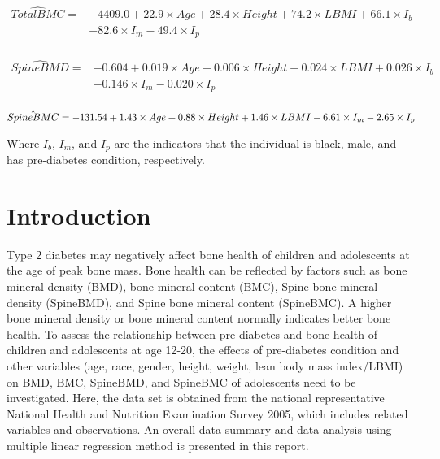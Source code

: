 \documentclass[11pt]{article}
\begin{document}
\begin{equation}
\begin{split}
\hat{TotalBMC} = &-4409.0 +22.9\times Age +28.4\times Height +74.2\times LBMI + 66.1\times I_b \\
& -82.6\times I_m -49.4\times I_p \\
\end{split}
\end{equation}

\begin{equation}
\begin{split}
\hat{SpineBMD} = &-0.604 +0.019\times Age +0.006\times Height +0.024\times LBMI + 0.026\times I_b \\
& -0.146\times I_m -0.020\times I_p \\
\end{split}
\end{equation}

\begin{equation}
\hat{SpineBMC} = -131.54 +1.43\times Age +0.88\times Height +1.46\times LBMI -6.61\times I_m -2.65\times I_p \\
\end{equation}

Where $I_b$, $I_m$, and $I_p$ are the indicators that the individual is black, male, and has pre-diabetes condition, respectively.


\newpage
\section{Introduction}
\setcounter{page}{1}
Type 2 diabetes may negatively affect bone health of children and adolescents at the age of peak bone mass. Bone health can be reflected by factors such as bone mineral density (BMD), bone mineral content (BMC), Spine bone mineral density (SpineBMD), and Spine bone mineral content (SpineBMC). A higher bone mineral density or bone mineral content normally indicates better bone health. To assess the relationship between pre-diabetes and bone health of children and adolescents at age 12-20, the effects of pre-diabetes condition and other variables (age, race, gender, height, weight, lean body mass index/LBMI) on BMD, BMC, SpineBMD, and SpineBMC of adolescents need to be investigated. Here, the data set is obtained from the national representative National Health and Nutrition Examination Survey 2005, which includes related variables and observations. An overall data summary and data analysis using multiple linear regression method is presented in this report.   
\end{document}
